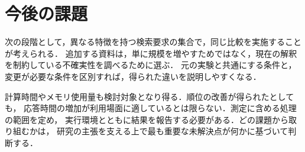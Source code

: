 \section{今後の課題}
次の段階として，異なる特徴を持つ検索要求の集合で，同じ比較を実施することが考えられる．
追加する資料は，単に規模を増やすためではなく，現在の解釈を制約している不確実性を調べるために選ぶ．
元の実験と共通にする条件と，変更が必要な条件を区別すれば，得られた違いを説明しやすくなる．

計算時間やメモリ使用量も検討対象となり得る．順位の改善が得られたとしても，
応答時間の増加が利用場面に適しているとは限らない．測定に含める処理の範囲を定め，
実行環境とともに結果を報告する必要がある．どの課題から取り組むかは，
研究の主張を支える上で最も重要な未解決点が何かに基づいて判断する．
